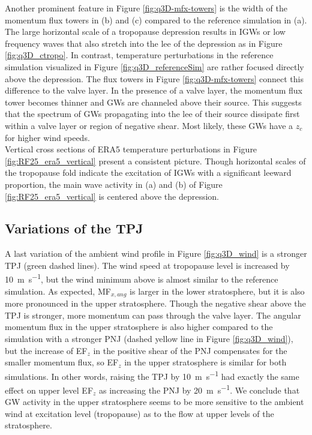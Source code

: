 Another prominent feature in Figure \ref{fig:q3D-mfx-towers} is the width of the momentum flux towers in (b) and (c) compared to the reference simulation in (a). The large horizontal scale of a tropopause depression results in IGWs or low frequency waves that also stretch into the lee of the depression as in Figure \ref{fig:q3D_ctropo}. In contrast, temperature perturbations in the reference simulation visualized in Figure \ref{fig:q3D_referenceSim} are rather focused directly above the depression. The flux towers in Figure \ref{fig:q3D-mfx-towers} connect this difference to the valve layer. In the presence of a valve layer, the momentum flux tower becomes thinner and GWs are channeled above their source. This suggests that the spectrum of GWs propagating into the lee of their source dissipate first within a valve layer or region of negative shear. Most likely, these GWs have a $z_c$ for higher wind speeds.\\
Vertical cross sections of ERA5 temperature perturbations in Figure \ref{fig:RF25_era5_vertical} present a consistent picture. Though horizontal scales of the tropopause fold indicate the excitation of IGWs with a significant leeward proportion, the main wave activity in (a) and (b) of Figure \ref{fig:RF25_era5_vertical} is centered above the depression.


\subsection*{Variations of the TPJ}
A last variation of the ambient wind profile in Figure \ref{fig:q3D_wind} is a stronger TPJ (green dashed lines). The wind speed at tropopause level is increased by \SI{10}{\meter\per\second}, but the wind minimum above is almost similar to the reference simulation. As expected, MF$_{x,ang}$ is larger in the lower stratosphere, but it is also more pronounced in the upper stratosphere. Though the negative shear above the TPJ is stronger, more momentum can pass through the valve layer. The angular momentum flux in the upper stratosphere is also higher compared to the simulation with a stronger PNJ (dashed yellow line in Figure \ref{fig:q3D_wind}), but the increase of EF$_z$ in the positive shear of the PNJ compensates for the smaller momentum flux, so EF$_z$ in the upper stratosphere is similar for both simulations. In other words, raising the TPJ by \SI{10}{\meter\per\second} had exactly the same effect on upper level EF$_z$ as increasing the PNJ by \SI{20}{\meter\per\second}. We conclude that GW activity in the upper stratosphere seems to be more sensitive to the ambient wind at excitation level (tropopause) as to the flow at upper levels of the stratosphere.

